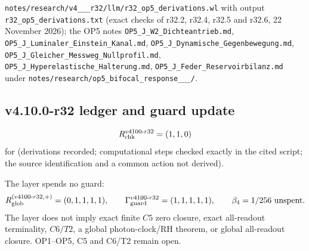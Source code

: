\texttt{notes/\allowbreak research/\allowbreak v4\_\_\_\allowbreak r32/\allowbreak llm/\allowbreak r32\_\allowbreak op5\_\allowbreak derivations.wl} with output
\texttt{r32\_\allowbreak op5\_\allowbreak derivations.txt} (exact checks of r32.2, r32.4, r32.5 and r32.6, 22 November 2026); the OP5 notes
\texttt{OP5\_\allowbreak J\_\allowbreak W2\_\allowbreak Dichteantrieb.md}, \texttt{OP5\_\allowbreak J\_\allowbreak Luminaler\_\allowbreak Einstein\_\allowbreak Kanal.md},
\texttt{OP5\_\allowbreak J\_\allowbreak Dynamische\_\allowbreak Gegenbewegung.md}, \texttt{OP5\_\allowbreak J\_\allowbreak Gleicher\_\allowbreak Messweg\_\allowbreak Nullprofil.md},
\texttt{OP5\_\allowbreak J\_\allowbreak Hyperelastische\_\allowbreak Halterung.md}, \texttt{OP5\_\allowbreak J\_\allowbreak Feder\_\allowbreak Reservoirbilanz.md} under
\texttt{notes/\allowbreak research/\allowbreak op5\_\allowbreak bifocal\_\allowbreak response\_\_\_/}.

\subsection*{v4.10.0-r32 ledger and guard update}
\label{subsec:v4100-r32-ledger-guard}

\[
R_{\rm chk}^{v4100\text{-}r32}=(1,1,0)
\]
for (derivations recorded; computational steps checked exactly in the cited script; the source identification and a common action not
derived).

The layer spends no guard:
\[
R_{\rm glob}^{(v4100\text{-}r32,+)}=(0,1,1,1,1),
\qquad
\Gamma_{\rm guard}^{v4100\text{-}r32}=(1,1,1,1,1),
\qquad
\beta_4=1/256\ \text{unspent}.
\]
The layer does not imply exact finite \(C5\) zero closure, exact all-readout terminality, \(C6/T2\), a global photon-clock/RH theorem,
or global all-readout closure.  OP1--OP5, C5 and C6/T2 remain open.
